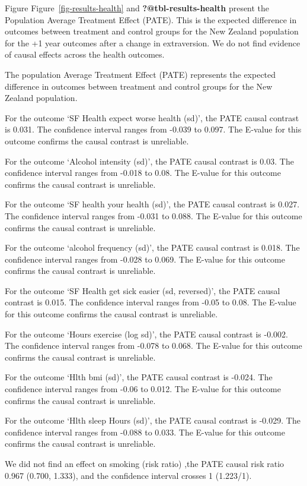 \documentclass[
  singlecolumn]{report}
\begin{document}
Figure Figure~\ref{fig-results-health} and \textbf{?@tbl-results-health}
present the Population Average Treatment Effect (PATE). This is the
expected difference in outcomes between treatment and control groups for
the New Zealand population for the +1 year outcomes after a change in
extraversion. We do not find evidence of causal effects across the
health outcomes.

The population Average Treatment Effect (PATE) represents the expected
difference in outcomes between treatment and control groups for the New
Zealand population.

For the outcome `SF Health expect worse health (sd)', the PATE causal
contrast is 0.031. The confidence interval ranges from -0.039 to 0.097.
The E-value for this outcome confirms the causal contrast is unreliable.

For the outcome `Alcohol intensity (sd)', the PATE causal contrast is
0.03. The confidence interval ranges from -0.018 to 0.08. The E-value
for this outcome confirms the causal contrast is unreliable.

For the outcome `SF health your health (sd)', the PATE causal contrast
is 0.027. The confidence interval ranges from -0.031 to 0.088. The
E-value for this outcome confirms the causal contrast is unreliable.

For the outcome `alcohol frequency (sd)', the PATE causal contrast is
0.018. The confidence interval ranges from -0.028 to 0.069. The E-value
for this outcome confirms the causal contrast is unreliable.

For the outcome `SF Health get sick easier (sd, reversed)', the PATE
causal contrast is 0.015. The confidence interval ranges from -0.05 to
0.08. The E-value for this outcome confirms the causal contrast is
unreliable.

For the outcome `Hours exercise (log sd)', the PATE causal contrast is
-0.002. The confidence interval ranges from -0.078 to 0.068. The E-value
for this outcome confirms the causal contrast is unreliable.

For the outcome `Hlth bmi (sd)', the PATE causal contrast is -0.024. The
confidence interval ranges from -0.06 to 0.012. The E-value for this
outcome confirms the causal contrast is unreliable.

For the outcome `Hlth sleep Hours (sd)', the PATE causal contrast is
-0.029. The confidence interval ranges from -0.088 to 0.033. The E-value
for this outcome confirms the causal contrast is unreliable.

We did not find an effect on smoking (risk ratio) ,the PATE causal risk
ratio 0.967 (0.700, 1.333), and the confidence interval crosses 1
(1.223/1).
\end{document}
